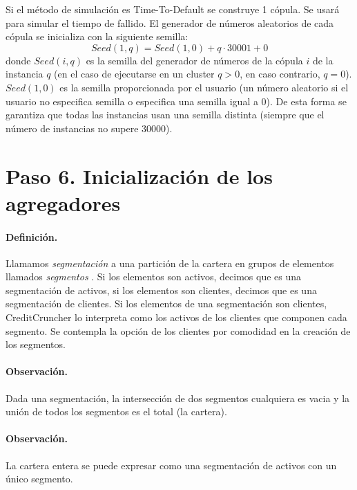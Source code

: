 Si el m\'etodo de simulaci\'on es Time-To-Default se construye
1 c\'opula. Se usar\'a para simular el tiempo de fallido.
\newline
\newline
El generador de n\'umeros aleatorios de cada c\'opula se
inicializa con la siguiente semilla:
\begin{displaymath}
Seed(1,q) = Seed(1,0) + q \cdot 30001 + 0
\end{displaymath}
donde $Seed(i,q)$ es la semilla del generador de n\'umeros de la
c\'opula $i$ de la instancia $q$ (en el caso de ejecutarse en un
cluster $q>0$, en caso contrario, $q=0$). $Seed(1,0)$ es la semilla
proporcionada por el usuario (un n\'umero aleatorio si el usuario no
especifica semilla o especifica una semilla igual a 0). De esta
forma se garantiza que todas las instancias usan una semilla distinta
(siempre que el n\'umero de instancias no supere 30000).


\section{Paso 6. Inicializaci\'on de los agregadores}

\paragraph{Definici\'on.} Llamamos \emph{segmentaci\'on}
a una partici\'on de la cartera en grupos de elementos llamados \emph{segmentos}
. Si los elementos son activos, decimos que es una segmentaci\'on
de activos, si los elementos son clientes, decimos que es una segmentaci\'on de
clientes. Si los elementos de una segmentaci\'on son clientes, CreditCruncher lo
interpreta como los activos de los clientes que componen cada segmento. Se contempla
la opci\'on de los clientes por comodidad en la creaci\'on de los segmentos.

\paragraph{Observaci\'on.} Dada una segmentaci\'on, la intersecci\'on
de dos segmentos cualquiera es vacia y la uni\'on de todos los
segmentos es el total (la cartera).

\paragraph{Observaci\'on.} La cartera entera se puede expresar como una
segmentaci\'on de activos con un \'unico segmento.

